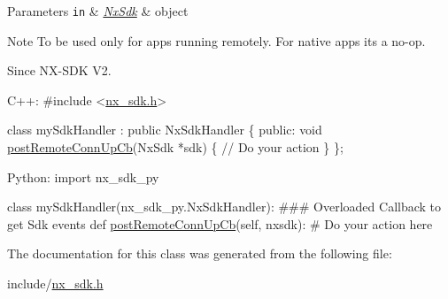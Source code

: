 \begin{DoxyParams}[1]{Parameters}
\mbox{\tt in}  & {\em \mbox{\hyperlink{classnxos_1_1_nx_sdk}{Nx\+Sdk}}} & object\\
\hline
\end{DoxyParams}
\begin{DoxyNote}{Note}
To be used only for apps running remotely. For native apps its a no-\/op.
\end{DoxyNote}
\begin{DoxySince}{Since}
N\+X-\/\+S\+DK V2. ~\newline
 
\begin{DoxyCode}
C++:                                                                                  
\textcolor{preprocessor}{   #include <\mbox{\hyperlink{nx__sdk_8h}{nx\_sdk.h}}>}                                          
                                                                            
   \textcolor{keyword}{class }mySdkHandler : \textcolor{keyword}{public} NxSdkHandler \{               
      \textcolor{keyword}{public}:                                           
         \textcolor{keywordtype}{void} \mbox{\hyperlink{classnxos_1_1_nx_sdk_handler_a71b575abab99f8798635035986dbdc3f}{postRemoteConnUpCb}}(NxSdk *sdk) \{         
              \textcolor{comment}{// Do your action                        }
         \}                                               
   \};                                                         
                                                              
Python:                                                     
   \textcolor{keyword}{import} nx\_sdk\_py                                                 
                                                                           
   \textcolor{keyword}{class }mySdkHandler(nx\_sdk\_py.NxSdkHandler):              
\textcolor{preprocessor}{   ### Overloaded Callback to get Sdk events                        }
         def \mbox{\hyperlink{classnxos_1_1_nx_sdk_handler_a71b575abab99f8798635035986dbdc3f}{postRemoteConnUpCb}}(self, nxsdk):                       
\textcolor{preprocessor}{             # Do your action here                              }
\end{DoxyCode}
 
\end{DoxySince}


The documentation for this class was generated from the following file\+:\begin{DoxyCompactItemize}
\item 
include/\mbox{\hyperlink{nx__sdk_8h}{nx\+\_\+sdk.\+h}}\end{DoxyCompactItemize}

